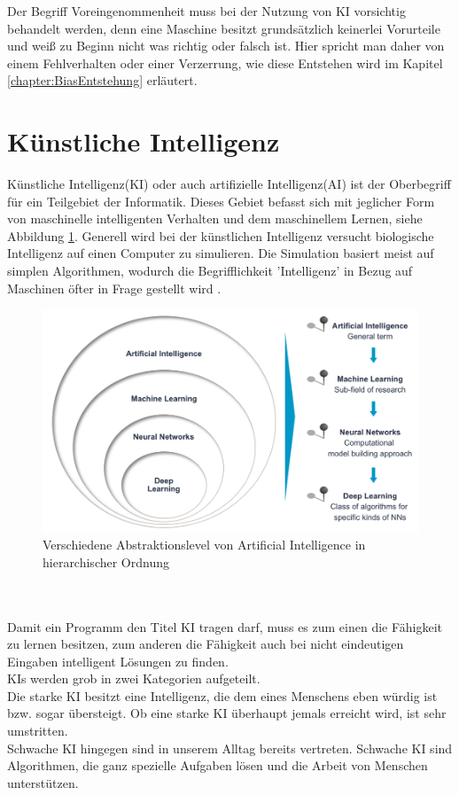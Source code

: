 \documentclass[12pt,oneside,a4paper,parskip]{scrbook}
\begin{document}
Der Begriff Voreingenommenheit muss bei der Nutzung von KI vorsichtig behandelt werden, denn eine Maschine besitzt grundsätzlich keinerlei Vorurteile und weiß zu Beginn nicht was richtig oder falsch ist. Hier spricht man daher von einem Fehlverhalten oder einer Verzerrung, wie diese Entstehen wird im Kapitel \ref{chapter:BiasEntstehung} erläutert.
\section{Künstliche Intelligenz}
Künstliche Intelligenz(KI) oder auch artifizielle Intelligenz(AI) ist der Oberbegriff für ein Teilgebiet der Informatik. Dieses Gebiet befasst sich mit jeglicher Form von maschinelle intelligenten Verhalten und dem maschinellem Lernen, siehe Abbildung \ref{fig:Uebersicht}. Generell wird bei der künstlichen Intelligenz versucht biologische Intelligenz auf einen Computer zu simulieren. Die Simulation basiert meist auf simplen Algorithmen, wodurch die Begrifflichkeit 'Intelligenz' in Bezug auf Maschinen öfter in Frage gestellt wird \cite{Grundlagen}.
\begin{figure}[ht]
	\begin{center}
		\includegraphics[width=14cm]{Bilder/Abstraktionslevel_von_AI.jpg}
		\caption{Verschiedene Abstraktionslevel von Artificial Intelligence in hierarchischer Ordnung}
		\label{fig:Uebersicht}
	\end{center}
\end{figure}
\\\\Damit ein Programm den Titel KI tragen darf, muss es zum einen die Fähigkeit zu lernen besitzen, zum anderen die Fähigkeit auch bei nicht eindeutigen Eingaben intelligent Lösungen zu finden.\\
KIs werden grob in zwei Kategorien aufgeteilt.\\
Die starke KI besitzt eine Intelligenz, die dem eines Menschens eben würdig ist bzw. sogar übersteigt. Ob eine starke KI überhaupt jemals erreicht wird, ist sehr umstritten. \\Schwache KI hingegen sind in unserem Alltag bereits vertreten. Schwache KI sind Algorithmen, die ganz spezielle Aufgaben lösen und die Arbeit von Menschen unterstützen.
\end{document}
